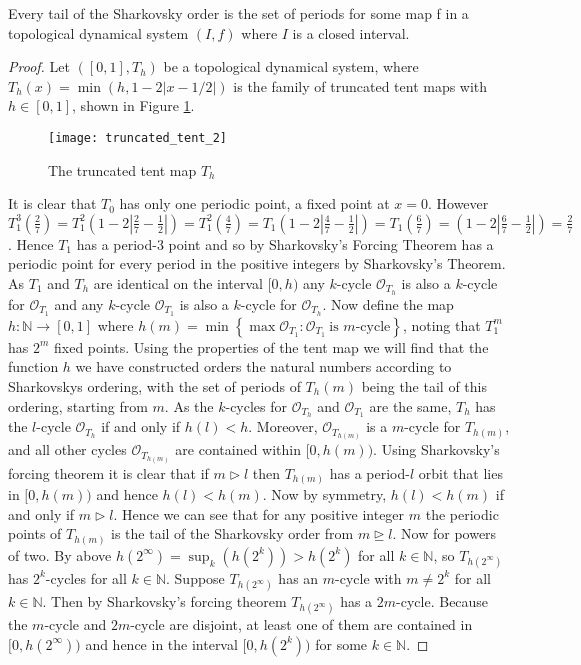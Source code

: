 \begin{thm} \label{thm:sharkovsky-realisation-theorem}
    Every tail of the Sharkovsky order is the set of periods for some map f in a topological dynamical system $(I, f)$ where $I$ is a closed interval.
    \begin{proof}
        Let $([0, 1], T_h)$ be a topological dynamical system, where $T_h(x) = \min(h, 1-2|x-1/2|)$ is the family of truncated tent maps with $h \in [0, 1]$, shown in Figure \ref{fig:truncated_tent}.
        \begin{figure}[h]
            \centering
            \texttt{[image: truncated\_tent\_2]}
            \label{fig:truncated_tent}
            \caption{The truncated tent map $T_h$}
        \end{figure}
        It is clear that $T_0$ has only one periodic point, a fixed point at $x = 0$. However $T_1^3\left(\frac{2}{7}\right) = T_1^2\left(1-2\left\lvert\frac{2}{7} - \frac{1}{2}\right\rvert\right) = T_1^2\left(\frac{4}{7}\right) = T_1\left(1-2\left\lvert\frac{4}{7} - \frac{1}{2}\right\rvert\right) = T_1\left(\frac{6}{7}\right) = \left(1-2\left\lvert\frac{6}{7} - \frac{1}{2}\right\rvert\right) = \frac{2}{7}$. Hence $T_1$ has a period-$3$ point and so by Sharkovsky's Forcing Theorem has a periodic point for every period in the positive integers by Sharkovsky's Theorem. As $T_1$ and $T_h$ are identical on the interval $[0, h)$ any $k$-cycle $\mathcal{O}_{T_h}$ is also a $k$-cycle for $\mathcal{O}_{T_1}$ and any $k$-cycle $\mathcal{O}_{T_1}$ is also a $k$-cycle for $\mathcal{O}_{T_h}$. Now define the map $h: \mathbb{N} \to [0, 1]$ where $h(m) = \min \left\lbrace \max \mathcal{O}_{T_1} : \mathcal{O}_{T_1} \ \text{is $m$-cycle} \right\rbrace$, noting that $T_1^m$ has $2^m$ fixed points. Using the properties of the tent map we will find that the function $h$ we have constructed orders the natural numbers according to Sharkovskys ordering, with the set of periods of $T_h(m)$ being the tail of this ordering, starting from $m$. As the $k$-cycles for $\mathcal{O}_{T_h}$ and $\mathcal{O}_{T_1}$ are the same, $T_h$ has the $l$-cycle $\mathcal{O}_{T_h}$ if and only if $h(l) < h$. Moreover, $\mathcal{O}_{T_{h(m)}}$ is a $m$-cycle for $T_{h(m)}$, and all other cycles $\mathcal{O}_{T_{h(m)}}$ are contained within $[0, h(m))$. Using Sharkovsky's forcing theorem it is clear that if $m \rhd l$ then $T_{h(m)}$ has a period-$l$ orbit that lies in $[0, h(m))$ and hence $h(l) < h(m)$. Now by symmetry, $h(l) < h(m)$ if and only if $m \rhd l$. Hence we can see that for any positive integer $m$ the periodic points of $T_{h(m)}$ is the tail of the Sharkovsky order from $m \unrhd l$. Now for powers of two. By above $h(2^\infty) = \sup_k(h(2^k)) > h(2^k)$ for all $k \in \mathbb{N}$, so $T_{h(2^\infty)}$ has $2^k$-cycles for all $k \in \mathbb{N}$. Suppose $T_{h(2^\infty)}$ has an $m$-cycle with $m \neq 2^k$ for all $k \in \mathbb{N}$. Then by Sharkovsky's forcing theorem $T_{h(2^\infty)}$ has a $2m$-cycle. Because the $m$-cycle and $2m$-cycle are disjoint, at least one of them are contained in $[0, h(2^\infty))$ and hence in the interval $[0, h(2^k))$ for some $k \in \mathbb{N}$.
    \end{proof}
\end{thm}


